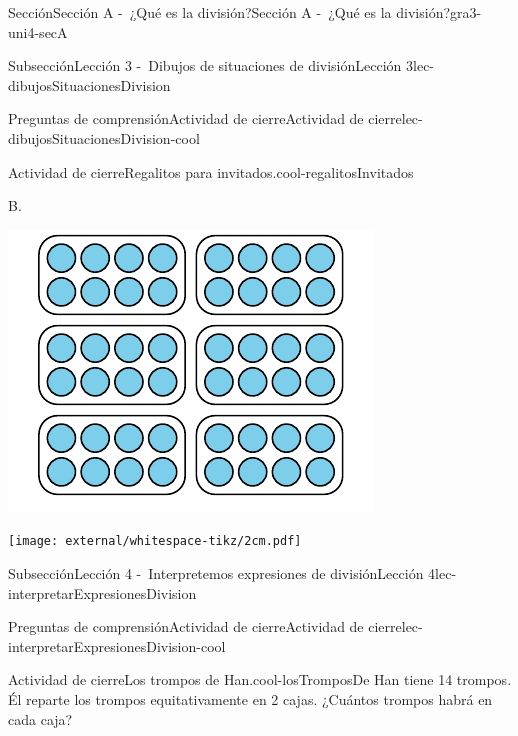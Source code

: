 \begin{sectionptx}{Sección}{Sección A -~¿Qué es la división?}{}{Sección A -~¿Qué es la división?}{}{}{gra3-uni4-secA}
\begin{subsectionptx}{Subsección}{Lección 3 -~Dibujos de situaciones de división}{}{Lección 3}{}{}{lec-dibujosSituacionesDivision}
\begin{reading-questions-subsubsection-numberless}{Preguntas de comprensión}{Actividad de cierre}{}{Actividad de cierre}{}{}{lec-dibujosSituacionesDivision-cool}
\begin{project}{Actividad de cierre}{Regalitos para invitados.}{cool-regalitosInvitados}
\begin{sidebyside}{2}{0}{0}{0}
\begin{sbspanel}{0.5}%
B.%
\par
\includegraphics[max width=\linewidth, center]{external/svg-source/tikz-file-246307.pdf}
\end{sbspanel}%
\end{sidebyside}%
\begin{image}{0}{1}{0}{}%
\texttt{[image: external/whitespace-tikz/2cm.pdf]}
\end{image}%
\end{project}%
\end{reading-questions-subsubsection-numberless}
\end{subsectionptx}
%
%
\typeout{************************************************}
\typeout{************************************************}
%
\begin{subsectionptx}{Subsección}{Lección 4 -~Interpretemos expresiones de división}{}{Lección 4}{}{}{lec-interpretarExpresionesDivision}
%
%
\typeout{************************************************}
\typeout{************************************************}
%
\begin{reading-questions-subsubsection-numberless}{Preguntas de comprensión}{Actividad de cierre}{}{Actividad de cierre}{}{}{lec-interpretarExpresionesDivision-cool}
\begin{project}{Actividad de cierre}{Los trompos de Han.}{cool-losTromposDe}%
Han tiene 14 trompos. Él reparte los trompos equitativamente en 2 cajas. ¿Cuántos trompos habrá en cada caja?%

\end{project}
\end{reading-questions-subsubsection-numberless}
\end{subsectionptx}
\end{sectionptx}
